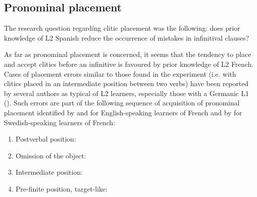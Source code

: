 \documentclass[output=paper,modfonts,nonflat,newtxmath]{langsci/langscibook}
\begin{document}
\subsection{Pronominal placement} %
\label{sec:sciutti:5.2}

The research question regarding clitic placement was the following: does prior knowledge of L2 Spanish reduce the occurrence of mistakes in infinitival clauses?

As far as pronominal placement is concerned, it seems that the tendency to place and accept clitics before an infinitive is favoured by prior knowledge of L2 French. Cases of placement errors similar to those found in the experiment (i.e. with clitics placed in an intermediate position between two verbs) have been reported by several authors as typical of L2 learners, especially those with a Germanic L1 (\citealt{GundelTarone1983, ConnorsNuckle1986, Zobl1992, TowellHawkins1994, GrondinWhite1996,  HulkMuller2000, Herschensohn2004, Ferrari2006, Maffei2009, Corino2012}). Such errors are part of the following sequence of acquisition of pronominal placement identified by \citet{TowellHawkins1994} and \citet{Herschensohn2004} for English-speaking learners of French and by \citet{Schlyter1997} for Swedish-speaking learners of French:

\begin{enumerate}
\item Postverbal position:
 		\z

\item Omission of the object:
			\z

\item Intermediate position:
		\z

\item Pre-finite position, target-like:%
				\z
\end{enumerate}
\end{document}
